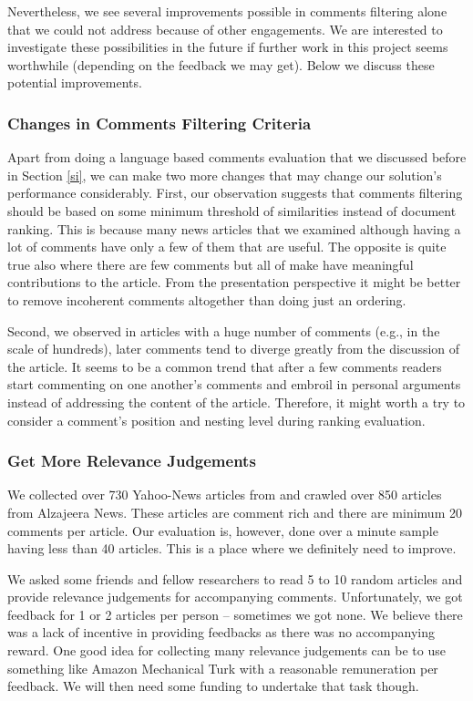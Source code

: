 \documentclass[article]{IEEEtran}
\begin{document}
Nevertheless, we see several improvements possible in comments filtering alone that we could not address because of other engagements. We are interested to investigate these possibilities in the future if further work in this project seems worthwhile (depending on the feedback we may get). Below we discuss these potential improvements.       

\subsubsection{Changes in Comments Filtering Criteria}
Apart from doing a language based comments evaluation that we discussed before in Section \ref{si}, we can make two more changes that may change our solution's performance considerably. First, our observation suggests that comments filtering should be based on some minimum threshold of similarities instead of document ranking. This is because many news articles that we examined although having a lot of comments have only a few of them that are useful. The opposite is quite true also where there are few comments but all of make have meaningful contributions to the article. From the presentation perspective it might be better to remove incoherent comments altogether than doing just an ordering.

Second, we observed in articles with a huge number of comments (e.g., in the scale of hundreds), later comments tend to diverge greatly from the discussion of the article. It seems to be a common trend that after a few comments readers start commenting on one another's comments and embroil in personal arguments instead of addressing the content of the article. Therefore, it might worth a try to consider a comment's position and nesting level during ranking evaluation.            

\subsubsection{Get More Relevance Judgements}
We collected over 730 Yahoo-News articles from \cite{Das:2014:GBC:2556195.2556231} and crawled over 850 articles from Alzajeera News. These articles are comment rich and there are minimum 20 comments per article. Our evaluation is, however, done over a minute sample having less than 40 articles. This is a place where we definitely need to improve.  

We asked some friends and fellow researchers to read 5 to 10 random articles and provide relevance judgements for accompanying comments. Unfortunately, we got feedback for 1 or 2 articles per person -- sometimes we got none. We believe there was a lack of incentive in providing feedbacks as there was no accompanying reward. One good idea for collecting many relevance judgements can be to use something like Amazon Mechanical Turk with a reasonable remuneration per feedback. We will then need some funding to undertake that task though.    
\end{document}
